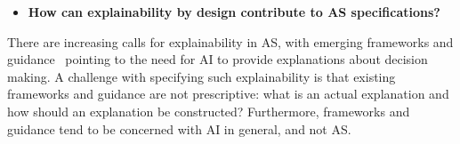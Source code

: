 \documentclass[sigconf,nonacm]{acmart}%
\begin{document}
	
	\begin{itemize}[leftmargin=0.5cm]
		\item \textbf{How can explainability by design contribute to AS specifications?}
	\end{itemize} 	
	There are increasing calls for explainability in AS, with emerging frameworks and guidance~\cite{Hamon:2020} pointing to the need for AI to provide explanations about decision making. A challenge with specifying such explainability is that existing frameworks and guidance are not prescriptive: what is an actual explanation and how should an explanation be constructed? Furthermore, frameworks and guidance tend to be concerned with AI in general, and not AS.
	
\end{document}
